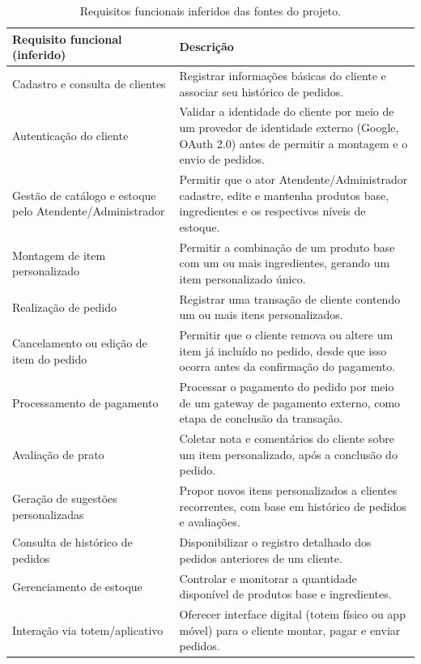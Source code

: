 \documentclass[a4paper,12pt,oneside,openany]{book}
\begin{document}
\begin{table}[H]
\centering
\caption{Requisitos funcionais inferidos das fontes do projeto.}
\begin{tabularx}{0.95\textwidth}{p{} X}
\toprule
\textbf{Requisito funcional (inferido)} & \textbf{Descrição} \\
\midrule
Cadastro e consulta de clientes & Registrar informações básicas do cliente e associar seu histórico de pedidos. \\
Autenticação do cliente & Validar a identidade do cliente por meio de um provedor de identidade externo (Google, OAuth 2.0) antes de permitir a montagem e o envio de pedidos. \\
Gestão de catálogo e estoque pelo Atendente/Administrador & Permitir que o ator Atendente/Administrador cadastre, edite e mantenha produtos base, ingredientes e os respectivos níveis de estoque. \\
Montagem de item personalizado & Permitir a combinação de um produto base com um ou mais ingredientes, gerando um item personalizado único. \\
Realização de pedido & Registrar uma transação de cliente contendo um ou mais itens personalizados. \\
Cancelamento ou edição de item do pedido & Permitir que o cliente remova ou altere um item já incluído no pedido, desde que isso ocorra antes da confirmação do pagamento. \\
Processamento de pagamento & Processar o pagamento do pedido por meio de um gateway de pagamento externo, como etapa de conclusão da transação. \\
Avaliação de prato & Coletar nota e comentários do cliente sobre um item personalizado, após a conclusão do pedido. \\
Geração de sugestões personalizadas & Propor novos itens personalizados a clientes recorrentes, com base em histórico de pedidos e avaliações. \\
Consulta de histórico de pedidos & Disponibilizar o registro detalhado dos pedidos anteriores de um cliente. \\
Gerenciamento de estoque & Controlar e monitorar a quantidade disponível de produtos base e ingredientes. \\
Interação via totem/aplicativo & Oferecer interface digital (totem físico ou app móvel) para o cliente montar, pagar e enviar pedidos. \\
\bottomrule
\end{tabularx}
\end{table}
\end{document}
